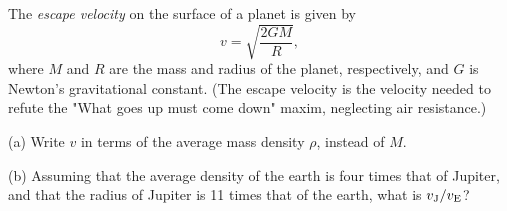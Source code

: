 The \textit{escape velocity} on the surface of a planet is given by
\begin{equation} v = \sqrt{\frac{2GM}{R}}, \tag{1.17} \end{equation}
where $M$ and $R$ are the mass and radius of the planet, respectively, and $G$ is Newton's gravitational constant. (The escape velocity is the velocity needed to refute the "What goes up must come down" maxim, neglecting air resistance.)

(a) Write $v$ in terms of the average mass density $\rho$, instead of $M$.

(b) Assuming that the average density of the earth is four times that of Jupiter, and that the radius of Jupiter is 11 times that of the earth, what is $v_{\rm J}/v_{\rm E}$?
